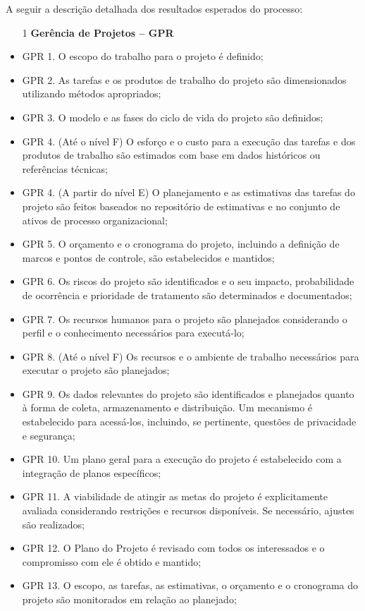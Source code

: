 \documentclass[	DIV=calc,%
							paper=a4,%
							fontsize=12pt,%
							onecolumn]{scrartcl}	 					%
\begin{document}
A seguir a descrição detalhada dos resultados esperados do processo:
\begin{itemize}
\item[1]{\textbf{Gerência de Projetos – GPR}}

\item GPR 1. O escopo do trabalho para o projeto é definido; 
\item GPR 2. As tarefas e os produtos de trabalho do projeto são dimensionados utilizando métodos apropriados; 
\item GPR 3. O modelo e as fases do ciclo de vida do projeto são definidos; 
\item GPR 4. (Até o nível F) O esforço e o custo para a execução das tarefas e dos produtos de trabalho são estimados com base em dados históricos ou referências técnicas; 
\item GPR 4. (A partir do nível E) O planejamento e as estimativas das tarefas do projeto são feitos baseados no repositório de estimativas e no conjunto de ativos de processo organizacional; 
\item GPR 5. O orçamento e o cronograma do projeto, incluindo a definição de marcos e pontos de controle, são estabelecidos e mantidos;
\item GPR 6. Os riscos do projeto são identificados e o seu impacto, probabilidade de ocorrência e prioridade de tratamento são determinados e documentados; 
\item GPR 7. Os recursos humanos para o projeto são planejados considerando o perfil e o conhecimento necessários para executá-lo; 
\item GPR 8. (Até o nível F) Os recursos e o ambiente de trabalho necessários para executar o projeto são planejados; 
\item GPR 9. Os dados relevantes do projeto são identificados e planejados quanto à forma de coleta, armazenamento e distribuição. Um mecanismo é estabelecido para acessá-los, incluindo, se pertinente, questões de privacidade e segurança; 
\item GPR 10. Um plano geral para a execução do projeto é estabelecido com a integração de planos específicos; 
\item GPR 11. A viabilidade de atingir as metas do projeto é explicitamente avaliada considerando restrições e recursos disponíveis. Se necessário, ajustes são realizados; 
\item GPR 12. O Plano do Projeto é revisado com todos os interessados e o compromisso com ele é obtido e mantido; 
\item GPR 13. O escopo, as tarefas, as estimativas, o orçamento e o cronograma do projeto são monitorados em relação ao planejado; 

\end{itemize}
\end{document}
